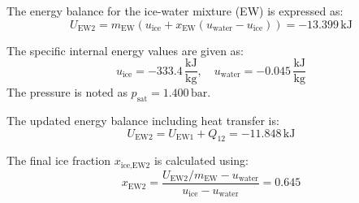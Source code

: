 The energy balance for the ice-water mixture (EW) is expressed as:  
\[
U_{\text{EW2}} = m_{\text{EW}} \left( u_{\text{ice}} + x_{\text{EW}} \left( u_{\text{water}} - u_{\text{ice}} \right) \right) = -13.399 \, \text{kJ}
\]  

The specific internal energy values are given as:  
\[
u_{\text{ice}} = -333.4 \, \frac{\text{kJ}}{\text{kg}}, \quad u_{\text{water}} = -0.045 \, \frac{\text{kJ}}{\text{kg}}
\]  
The pressure is noted as \( p_{\text{sat}} = 1.400 \, \text{bar} \).  

The updated energy balance including heat transfer is:  
\[
U_{\text{EW2}} = U_{\text{EW1}} + Q_{12} = -11.848 \, \text{kJ}
\]  

The final ice fraction \( x_{\text{ice,EW2}} \) is calculated using:  
\[
x_{\text{EW2}} = \frac{U_{\text{EW2}} / m_{\text{EW}} - u_{\text{water}}}{u_{\text{ice}} - u_{\text{water}}} = 0.645
\]